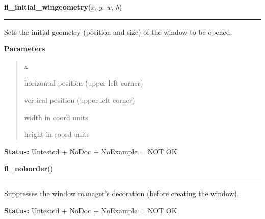 \hspace{.8\funcindent}\begin{boxedminipage}{\funcwidth}

    \raggedright \textbf{fl\_initial\_wingeometry}(\textit{x}, \textit{y}, \textit{w}, \textit{h})

    \vspace{-1.5ex}

    \rule{\textwidth}{0.5\fboxrule}
\setlength{\parskip}{2ex}
    Sets the initial geometry (position and size) of the window to be 
    opened.

\setlength{\parskip}{1ex}
      \textbf{Parameters}
      \vspace{-1ex}

      \begin{quote}
        \begin{Ventry}{x}

          \item[x]

          horizontal position (upper-left corner)

          \item[y]

          vertical position (upper-left corner)

          \item[w]

          width in coord units

          \item[h]

          height in coord units

        \end{Ventry}

      \end{quote}

\textbf{Status:} Untested + NoDoc + NoExample = NOT OK



    \end{boxedminipage}

    \label{xformslib:library:fl_noborder}

    \vspace{0.5ex}

\hspace{.8\funcindent}\begin{boxedminipage}{\funcwidth}

    \raggedright \textbf{fl\_noborder}()

    \vspace{-1.5ex}

    \rule{\textwidth}{0.5\fboxrule}
\setlength{\parskip}{2ex}
    Suppresses the window manager's decoration (before creating the 
    window).

\setlength{\parskip}{1ex}
\textbf{Status:} Untested + NoDoc + NoExample = NOT OK



    \end{boxedminipage}

